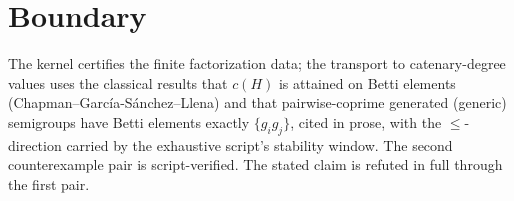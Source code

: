 \documentclass[11pt]{article}
\begin{document}
\section{Boundary}

The kernel certifies the finite factorization data; the transport to
catenary-degree values uses the classical results that $c(H)$ is
attained on Betti elements (Chapman--Garc\'ia-S\'anchez--Llena) and
that pairwise-coprime generated (generic) semigroups have Betti
elements exactly $\{g_i g_j\}$, cited in prose, with the
$\le$-direction carried by the exhaustive script's stability window.
The second counterexample pair is script-verified. The stated claim is
refuted in full through the first pair.
\end{document}
